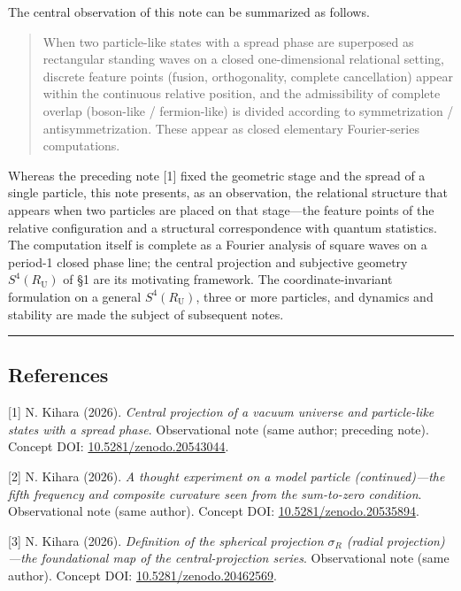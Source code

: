 \documentclass[
]{article}
\begin{document}
The central observation of this note can be summarized as follows.

\begin{quote}
When two particle-like states with a spread phase are superposed as
rectangular standing waves on a closed one-dimensional relational
setting, discrete feature points (fusion, orthogonality, complete
cancellation) appear within the continuous relative position, and the
admissibility of complete overlap (boson-like / fermion-like) is divided
according to symmetrization / antisymmetrization. These appear as closed
elementary Fourier-series computations.
\end{quote}

Whereas the preceding note {[}1{]} fixed the geometric stage and the
spread of a single particle, this note presents, as an observation, the
relational structure that appears when two particles are placed on that
stage---the feature points of the relative configuration and a
structural correspondence with quantum statistics. The computation
itself is complete as a Fourier analysis of square waves on a period-1
closed phase line; the central projection and subjective geometry
\(S^4(R_{\mathrm U})\) of §1 are its motivating framework. The
coordinate-invariant formulation on a general \(S^4(R_{\mathrm U})\),
three or more particles, and dynamics and stability are made the subject
of subsequent notes.

\begin{center}\rule{0.5\linewidth}{0.5pt}\end{center}

\subsection{References}\label{references}

{[}1{]} N. Kihara (2026). \emph{Central projection of a vacuum universe
and particle-like states with a spread phase}. Observational note (same
author; preceding note). Concept DOI:
\href{https://doi.org/10.5281/zenodo.20543044}{10.5281/zenodo.20543044}.

{[}2{]} N. Kihara (2026). \emph{A thought experiment on a model particle
(continued)---the fifth frequency and composite curvature seen from the
sum-to-zero condition}. Observational note (same author). Concept DOI:
\href{https://doi.org/10.5281/zenodo.20535894}{10.5281/zenodo.20535894}.

{[}3{]} N. Kihara (2026). \emph{Definition of the spherical projection
\(\sigma_R\) (radial projection)---the foundational map of the
central-projection series}. Observational note (same author). Concept
DOI:
\href{https://doi.org/10.5281/zenodo.20462569}{10.5281/zenodo.20462569}.
\end{document}
